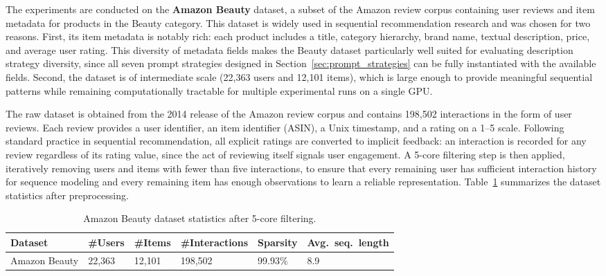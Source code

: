 \documentclass[12pt,a4paper]{report}
\begin{document}
\justifying
The experiments are conducted on the \textbf{Amazon Beauty} dataset, a subset
of the Amazon review corpus \citep{mcauley2015image} containing user reviews
and item metadata for products in the Beauty category. This dataset is widely
used in sequential recommendation research
\citep{kang2018sasrec, sun2019bert4rec} and was chosen for two reasons. First,
its item metadata is notably rich: each product includes a title, category
hierarchy, brand name, textual description, price, and average user rating.
This diversity of metadata fields makes the Beauty dataset particularly well
suited for evaluating description strategy diversity, since all seven prompt
strategies designed in Section~\ref{sec:prompt_strategies} can be fully
instantiated with the available fields. Second, the dataset is of intermediate
scale (22,363 users and 12,101 items), which is large enough to provide
meaningful sequential patterns while remaining computationally tractable for
multiple experimental runs on a single GPU.

The raw dataset is obtained from the 2014 release of the Amazon review corpus
and contains 198,502 interactions in the form of user reviews. Each review
provides a user identifier, an item identifier (ASIN), a Unix timestamp, and a
rating on a 1--5 scale. Following standard practice in sequential
recommendation, all explicit ratings are converted to implicit feedback: an
interaction is recorded for any review regardless of its rating value, since
the act of reviewing itself signals user engagement. A 5-core filtering step is
then applied, iteratively removing users and items with fewer than five
interactions, to ensure that every remaining user has sufficient interaction
history for sequence modeling and every remaining item has enough observations
to learn a reliable representation. Table~\ref{tab:beauty_stats} summarizes the
dataset statistics after preprocessing.

\begin{table}[h]
\centering
\caption{Amazon Beauty dataset statistics after 5-core filtering.}
\label{tab:beauty_stats}
\begin{tabular}{p{2.8cm} p{1.8cm} p{1.8cm} p{2.2cm} p{2.2cm} p{2.2cm}}
\toprule
\textbf{Dataset} & \textbf{\#Users} & \textbf{\#Items} &
\textbf{\#Interactions} & \textbf{Sparsity} & \textbf{Avg.\ seq.\ length} \\
\midrule
Amazon Beauty & 22{,}363 & 12{,}101 & 198{,}502 & 99.93\% & 8.9 \\
\bottomrule
\end{tabular}
\end{table}
\end{document}
